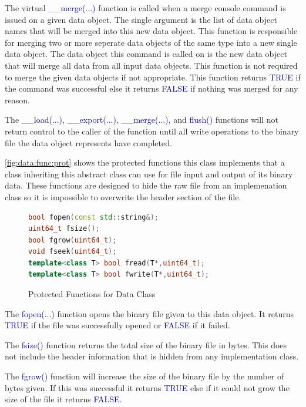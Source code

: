 \documentclass[10pt]{article}
\providecommand{\h}[1]{\textcolor{darkblue}{#1}}
\begin{document}
The virtual \h{\_\_merge(...)} function is called when a merge console command 
is issued on a given data object. The single argument is the list of data 
object names that will be merged into this new data object. This function is 
responsible for merging two or more seperate data objects of the same type into 
a new single data object. The data object this command is called on is the new 
data object that will merge all data from all input data objects. This function 
is not required to merge the given data objects if not appropriate. This 
function returns \h{TRUE} if the command was successful else it returns 
\h{FALSE} if nothing was merged for any reason.

The \h{\_\_load(...)}, \h{\_\_export(...)}, \h{\_\_merge(...)}, and \h{flush()} 
functions will not return control to the caller of the function until all write 
operations to the binary file the data object represents have completed.

\autoref{fig:data:func:prot} shows the protected functions this class 
implements that a class inheriting this abstract class can use for file input 
and output of its binary data. These functions are designed to hide the raw 
file from an implemenation class so it is impossible to overwrite the header 
section of the file.

\begin{figure}[H]
\begin{mdframed}[style=functions]
\begin{lstlisting}[language=C++]
bool fopen(const std::string&);
uint64_t fsize();
bool fgrow(uint64_t);
void fseek(uint64_t);
template<class T> bool fread(T*,uint64_t);
template<class T> bool fwrite(T*,uint64_t);
\end{lstlisting}
\end{mdframed}
\caption{Protected Functions for Data Class}
\label{fig:data:func:prot}
\end{figure}

The \h{fopen(...)} function opens the binary file given to this data object. It 
returns \h{TRUE} if the file was successfully opened or \h{FALSE} if it failed.

The \h{fsize()} function returns the total size of the binary file in bytes. 
This does not include the header information that is hidden from any 
implementation class.

The \h{fgrow()} function will increase the size of the binary file by the 
number of bytes given. If this was successful it returns \h{TRUE} else if it 
could not grow the size of the file it returns \h{FALSE}.
\end{document}
